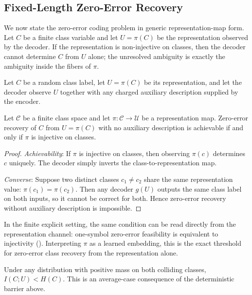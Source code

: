 \subsection{Fixed-Length Zero-Error Recovery}

We now state the zero-error coding problem in generic representation-map form. Let $C$ be a finite class variable and let $U=\pi(C)$ be the representation observed by the decoder. If the representation is non-injective on classes, then the decoder cannot determine $C$ from $U$ alone; the unresolved ambiguity is exactly the ambiguity inside the fibers of $\pi$.

\begin{definition}
Let $C$ be a random class label, let $U=\pi(C)$ be its representation, and let the decoder observe $U$ together with any charged auxiliary description supplied by the encoder.
\end{definition}

\begin{theorem}\label{thm:identification-capacity}
Let $\mathcal{C}$ be a finite class space and let $\pi : \mathcal{C} \to \mathcal{U}$ be a representation map. Zero-error recovery of $C$ from $U=\pi(C)$ with no auxiliary description is achievable if and only if $\pi$ is injective on classes.
\end{theorem}

\begin{proof}
\emph{Achievability}: If $\pi$ is injective on classes, then observing $\pi(c)$ determines $c$ uniquely. The decoder simply inverts the class-to-representation map.

\emph{Converse}: Suppose two distinct classes $c_1 \neq c_2$ share the same representation value: $\pi(c_1)=\pi(c_2)$. Then any decoder $g(U)$ outputs the same class label on both inputs, so it cannot be correct for both. Hence zero-error recovery without auxiliary description is impossible.
\end{proof}

In the finite explicit setting, the same condition can be read directly from the representation channel: one-symbol zero-error feasibility is equivalent to injectivity (). Interpreting $\pi$ as a learned embedding, this is the exact threshold for zero-error class recovery from the representation alone.

\begin{remark}
Under any distribution with positive mass on both colliding classes, $I(C;U) < H(C)$. This is an average-case consequence of the deterministic barrier above.
\end{remark}

